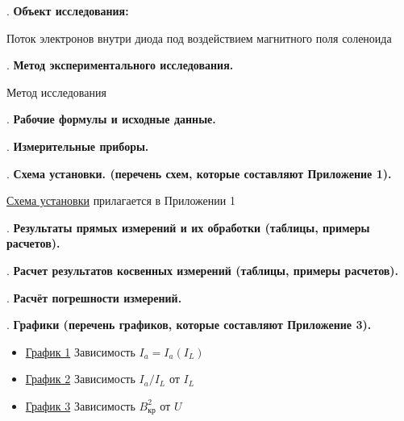\documentclass[12pt]{article}
\newcommand{\placeholder}[1]{{\color{magenta}#1}}
\begin{document}
    \mediumvspace

    . \textbf{Объект исследования: } 
    
    Поток электронов внутри диода под воздействием магнитного поля соленоида

    \mediumvspace

    . \textbf{Метод экспериментального исследования.}

    \placeholder{Метод исследования}

    \mediumvspace

    . \textbf{Рабочие формулы и исходные данные.}

    

    \mediumvspace

    . \textbf{Измерительные приборы.}

    \smallvspace

    

    \mediumvspace

    . \textbf{Схема установки. (перечень схем, которые составляют Приложение 1).}

    \hyperlink{schema1}{Схема установки} прилагается в Приложении 1

    \mediumvspace

    . \textbf{Результаты прямых измерений и их обработки (таблицы, примеры расчетов).}

    

    \mediumvspace

    . \textbf{Расчет результатов косвенных измерений (таблицы, примеры расчетов).}

    

    \mediumvspace

    . \textbf{Расчёт погрешности измерений.}
    
    

    \mediumvspace

    . \textbf{Графики (перечень графиков, которые составляют Приложение 3).}

    \begin{itemize}
        \item \hyperlink{diagram1}{График 1} Зависимость $I_a = I_a(I_L)$
        \item \hyperlink{diagram2}{График 2} Зависимость $I_a/I_L$ от $I_L$
        \item \hyperlink{diagram3}{График 3} Зависимость $B^2_\text{кр}$ от $U$
    \end{itemize}
\end{document}
